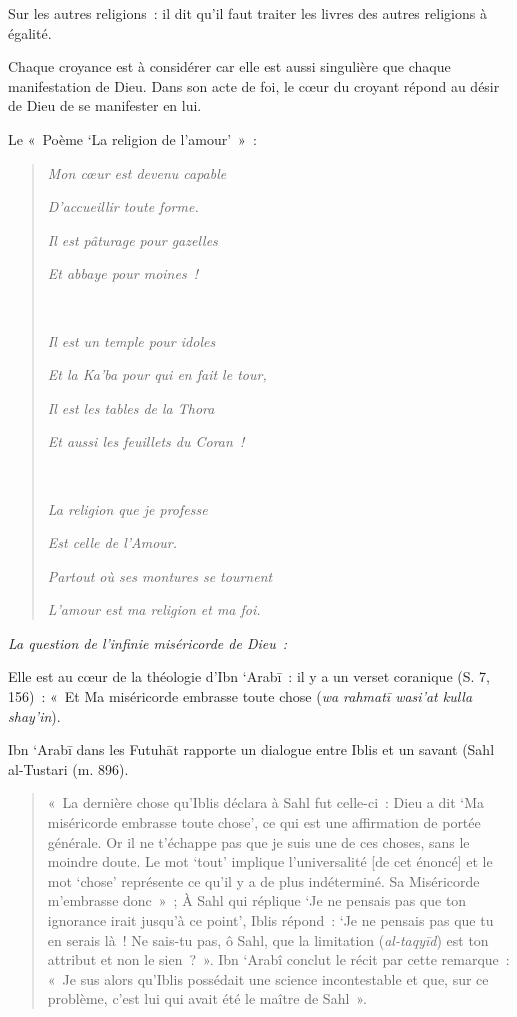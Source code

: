 Sur les autres religions~: il dit qu'il faut traiter les livres des
autres religions à égalité.

Chaque croyance est à considérer car elle est aussi singulière que
chaque manifestation de Dieu. Dans son acte de foi, le cœur du croyant
répond au désir de Dieu de se manifester en lui.

Le «~Poème `La religion de l'amour'~»~:

\begin{quote}
\emph{Mon cœur est devenu capable}

\emph{D'accueillir toute forme.}

\emph{Il est pâturage pour gazelles}

\emph{Et abbaye pour moines~!}

\emph{~}

\emph{Il est un temple pour idoles}

\emph{Et la Ka'ba pour qui en fait le tour,}

\emph{Il est les tables de la Thora}

\emph{Et aussi les feuillets du Coran~!}

\emph{~}

\emph{La religion que je professe}

\emph{Est celle de l'Amour.}

\emph{Partout où ses montures se tournent}

\emph{L'amour est ma religion et ma foi.}
\end{quote}

\emph{La question de l'infinie miséricorde de Dieu~:}

Elle est au cœur de la théologie d'Ibn `Arabī~: il y a un verset
coranique (S. 7, 156)~: «~Et Ma miséricorde embrasse toute chose
(\emph{wa rahmatī wasi'at kulla shay'in}).

Ibn `Arabī dans les Futuhāt rapporte un dialogue entre Iblis et un
savant (Sahl al-Tustari (m. 896).
\begin{quote}
    «~La dernière chose qu'Iblis déclara à Sahl fut celle-ci~: Dieu a dit
`Ma miséricorde embrasse toute chose', ce qui est une affirmation de
portée générale. Or il ne t'échappe pas que je suis une de ces choses,
sans le moindre doute. Le mot `tout' implique l'universalité {[}de cet
énoncé{]} et le mot `chose' représente ce qu'il y a de plus indéterminé.
Sa Miséricorde m'embrasse donc~»~; À Sahl qui réplique `Je ne pensais
pas que ton ignorance irait jusqu'à ce point', Iblis répond~: `Je ne
pensais pas que tu en serais là~! Ne sais-tu pas, ô Sahl, que la
limitation (\emph{al-taqyīd}) est ton attribut et non le sien~?~». Ibn
`Arabî conclut le récit par cette remarque~: «~Je sus alors qu'Iblis
possédait une science incontestable et que, sur ce problème, c'est lui
qui avait été le maître de Sahl~».

\end{quote}

